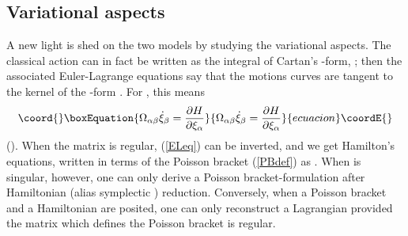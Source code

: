 \documentclass[a4paper,11pt]{article}
\def\p{{\partial}}
\begin{document}
\subsection{Variational aspects}

A new light  is shed on the two models by
studying the variational aspects.
The classical action can in fact be written as the integral of
Cartan's \coordHE{}-form, \coordHE{} \cite{SSD}; then the
associated Euler-Lagrange equations say that the motions curves
are tangent to the kernel of the \coordHE{}-form \coordHE{} \cite{SSD}.
For
\coordHE{}, this means
\begin{equation}\coord{}\boxEquation{
\Omega_{\alpha\beta}\dot{\xi}_{\beta}=\frac{\p H}{\p\xi_{\alpha}}
\label{ELeq}
}{
\Omega_{\alpha\beta}\dot{\xi}_{\beta}=\frac{\p H}{\p\xi_{\alpha}}
}{ecuacion}\coordE{}\end{equation}
(\coordHE{}). When the matrix
\myHighlight{$\Omega_{\alpha\beta}$}\coordHE{} is regular,
(\ref{ELeq}) can be inverted, and we get Hamilton's equations, written
in terms of the Poisson bracket (\ref{PBdef}) as \coordHE{}.
When  \myHighlight{$\Omega_{\alpha\beta}$}\coordHE{} is singular, however, one can only
derive a Poisson bracket-formulation after Hamiltonian \cite{FaJa}
(alias symplectic \cite{SSD}) reduction.
Conversely, when a Poisson bracket
and a Hamiltonian
are  posited, one can only reconstruct a Lagrangian
provided the matrix \coordHE{} which defines the Poisson bracket
is regular.
\end{document}
